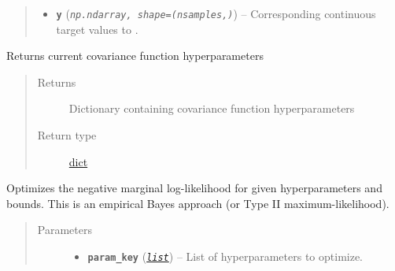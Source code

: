 \documentclass[letterpaper,10pt,english]{sphinxmanual}
\begin{document}
\begin{fulllineitems}
\begin{fulllineitems}
\begin{quote}
\begin{description}
\begin{itemize}
\item {} 
\textbf{\texttt{y}} (\emph{\texttt{np.ndarray, shape=(nsamples,)}}) -- Corresponding continuous target values to .

\end{itemize}

\end{description}\end{quote}

\end{fulllineitems}


\begin{fulllineitems}
\label{pyGPGO.surrogates.tStudentProcess:pyGPGO.surrogates.tStudentProcess.tStudentProcess.getcovparams}
Returns current covariance function hyperparameters
\begin{quote}\begin{description}
\item[{Returns}] \leavevmode
Dictionary containing covariance function hyperparameters

\item[{Return type}] \leavevmode
\href{https://docs.python.org/2/library/stdtypes.html\#dict}{dict}

\end{description}\end{quote}

\end{fulllineitems}


\begin{fulllineitems}
\label{pyGPGO.surrogates.tStudentProcess:pyGPGO.surrogates.tStudentProcess.tStudentProcess.optHyp}
Optimizes the negative marginal log-likelihood for given hyperparameters and bounds.
This is an empirical Bayes approach (or Type II maximum-likelihood).
\begin{quote}\begin{description}
\item[{Parameters}] \leavevmode\begin{itemize}
\item {} 
\textbf{\texttt{param\_key}} (\href{https://docs.python.org/2/library/functions.html\#list}{\emph{\texttt{list}}}) -- List of hyperparameters to optimize.


\end{itemize}
\end{description}
\end{quote}
\end{fulllineitems}
\end{fulllineitems}
\end{document}
